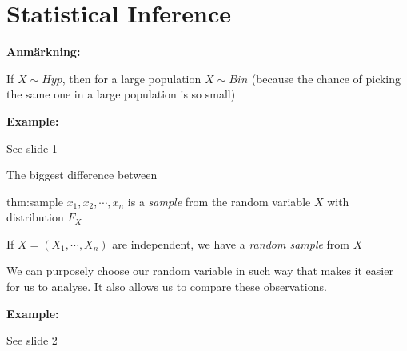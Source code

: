 \section{Statistical Inference}\par
\noindent\textbf{Anmärkning:}\par
\noindent If $X\sim Hyp$, then for a large population $X\sim Bin$ (because the chance of picking the same one in a large population is so small)
\par\bigskip
\noindent\textbf{Example:}\par
\noindent See slide 1
\par\bigskip
\noindent The biggest difference between 
\par\bigskip
\begin{theo}{thm:sample}
  $x_1,x_2,\cdots,x_n$ is a \textit{sample} from the random variable $X$ with distribution $F_X$
  \par\bigskip
  \noindent If $X = (X_1,\cdots,X_n)$ are independent, we have a \textit{random sample} from $X$
\end{theo}
\par\bigskip
\noindent We can purposely choose our random variable in such way that makes it easier for us to analyse. It also allows us to compare these observations.
\par\bigskip
\noindent\textbf{Example:}\par
\noindent See slide 2
\par\bigskip
